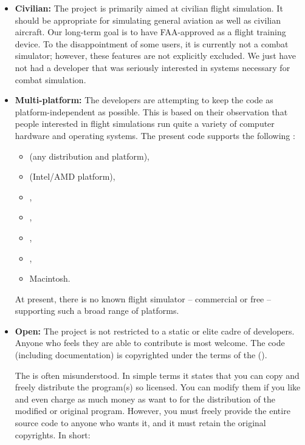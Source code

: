 \begin{itemize}
 \item \textbf{Civilian:} The project is primarily aimed
 at civilian flight simulation.  It should be appropriate for simulating general aviation
 as well as civilian aircraft.  Our long-term goal is to have \FlightGear{} FAA-approved as
 a flight training device.  To the disappointment of some users, it is currently not a
 combat simulator; however, these features are not explicitly excluded.  We just have
 not had a developer that was seriously interested in systems necessary for combat
 simulation.

 \item\textbf{Multi-platform:} The
 developers are attempting to keep the code as platform-independent as possible. This
 is based on their observation that people interested in flight simulations run quite a
 variety of computer hardware and operating systems. The present code supports the
 following :
  \begin{itemize}
  \item{} (any distribution and platform),
  \item{} (Intel/AMD platform),
  \item{},
  \item{},
  \item{},
  \item{},
  \item{Macintosh.}
  \end{itemize}

At present, there is no known flight simulator -- commercial or free -- supporting such a
broad range of platforms.

  \item\textbf{Open:} The project is not restricted to a
  static or elite cadre of developers. Anyone who feels they are able to contribute
  is most welcome.  The code (including documentation) is copyrighted under the
  terms of the  ().

  The  is often misunderstood. In simple terms it
  states that you can copy and freely distribute the program(s) so licensed.
  You can modify them if you like and even charge as much money as want to for the
  distribution of the modified or original program.  However, you must freely provide
  the entire source code to anyone who wants it, and it must retain the original copyrights.
  In short:
\medskip


\end{itemize}
